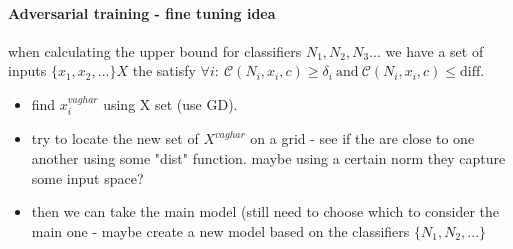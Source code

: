 \documentclass[11pt]{article}
\begin{document}
\paragraph{Adversarial training - fine tuning idea}
when calculating the upper bound for classifiers $N_1,N_2,N_3...$ we have a set of inputs $\{x_1,x_2,...\}X$ the satisfy $\forall{i}:\ \mathcal{C}(N_i,x_i,c) \geq \delta_i\ \text{and}\ \mathcal{C}(N_i,x_i,c) \leq \text{diff}$.
\begin{itemize}
\item find $x_i^{vaghar}$ using X set (use GD).
\item try to locate the new set of $X^{vaghar}$ on a grid - see if the are close to one another using some "dist" function. maybe using a certain norm they capture some input space?
\item then we can take the main model (still need to choose which to consider the main one - maybe create a new model based on the classifiers $\{N_1,N_2,...\}$
\end{itemize}
\end{document}
